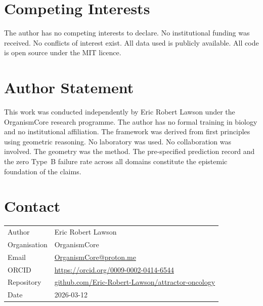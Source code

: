 \documentclass[12pt, a4paper]{article}
\theoremstyle{definition}
\theoremstyle{remark}
\begin{document}
\section*{Competing Interests}

The author has no competing interests to declare. No
institutional funding was received. No conflicts of interest
exist. All data used is publicly available. All code is
open source under the MIT licence.

\section*{Author Statement}

This work was conducted independently by Eric Robert Lawson
under the OrganismCore research programme. The author has no
formal training in biology and no institutional affiliation.
The framework was derived from first principles using
geometric reasoning. No laboratory was used. No collaboration
was involved. The geometry was the method. The pre-specified
prediction record and the zero Type~B failure rate across all
domains constitute the epistemic foundation of the claims.

\section*{Contact}

\begin{tabular}{ll}
Author        & Eric Robert Lawson \\
Organisation  & OrganismCore \\
Email         &
  \href{mailto:OrganismCore@proton.me}
       {OrganismCore@proton.me} \\
ORCID         &
  \href{https://orcid.org/0009-0002-0414-6544}
       {https://orcid.org/0009-0002-0414-6544} \\
Repository    &
  \href{https://github.com/Eric-Robert-Lawson/attractor-oncology}
       {github.com/Eric-Robert-Lawson/attractor-oncology} \\
Date          & 2026-03-12 \\
\end{tabular}
\end{document}
